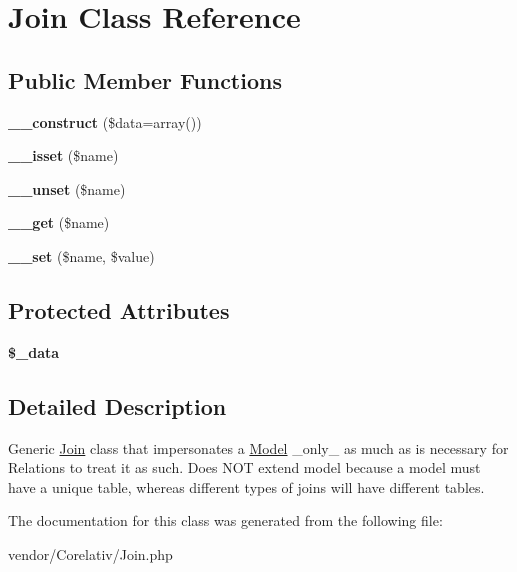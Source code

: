 \hypertarget{classJoin}{
\section{Join Class Reference}
\label{classJoin}
}
\subsection*{Public Member Functions}
\begin{DoxyCompactItemize}
\item 
\hypertarget{classJoin_a2bba8e9f71968c16d75036086edacb5f}{
{\bfseries \_\-\_\-construct} (\$data=array())}
\label{classJoin_a2bba8e9f71968c16d75036086edacb5f}

\item 
\hypertarget{classJoin_a49abb7eafb66109cc9acf884e8c7d845}{
{\bfseries \_\-\_\-isset} (\$name)}
\label{classJoin_a49abb7eafb66109cc9acf884e8c7d845}

\item 
\hypertarget{classJoin_ac7c2970b25a0db12c8bff2c6581b42df}{
{\bfseries \_\-\_\-unset} (\$name)}
\label{classJoin_ac7c2970b25a0db12c8bff2c6581b42df}

\item 
\hypertarget{classJoin_a2a6b84ba81d7d97f2c3c21cb4572f8bf}{
{\bfseries \_\-\_\-get} (\$name)}
\label{classJoin_a2a6b84ba81d7d97f2c3c21cb4572f8bf}

\item 
\hypertarget{classJoin_af893a47856c7fce88f93e069c5f317be}{
{\bfseries \_\-\_\-set} (\$name, \$value)}
\label{classJoin_af893a47856c7fce88f93e069c5f317be}

\end{DoxyCompactItemize}
\subsection*{Protected Attributes}
\begin{DoxyCompactItemize}
\item 
\hypertarget{classJoin_ab573bcb867d3b1965e6d851dce7fb387}{
{\bfseries \$\_\-data}}
\label{classJoin_ab573bcb867d3b1965e6d851dce7fb387}

\end{DoxyCompactItemize}


\subsection{Detailed Description}
Generic \hyperlink{classJoin}{Join} class that impersonates a \hyperlink{classModel}{Model} \_\-only\_\- as much as is necessary for Relations to treat it as such. Does NOT extend model because a model must have a unique table, whereas different types of joins will have different tables. 

The documentation for this class was generated from the following file:\begin{DoxyCompactItemize}
\item 
vendor/Corelativ/Join.php\end{DoxyCompactItemize}
